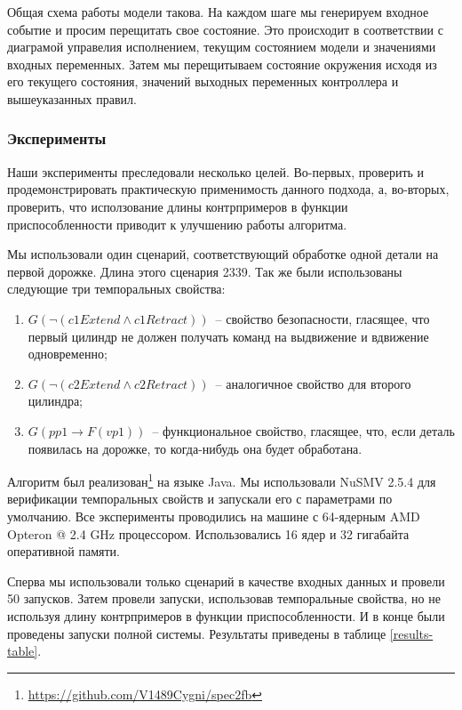 \documentclass[14pt]{extarticle}
\theoremstyle{plain}
\theoremstyle{definition}
\begin{document}
Общая схема работы модели такова. На каждом шаге мы генерируем входное событие
и просим перещитать свое состояние. Это происходит в соответствии с диаграмой
управелия исполнением, текущим состоянием модели и значениями входных
переменных. Затем мы перещитываем состояние окружения исходя из его текущего
состояния, значений выходных переменных контроллера и вышеуказанных правил.

\subsubsection{Эксперименты}

Наши эксперименты преследовали несколько целей. Во-первых, проверить и
продемонстрировать практическую применимость данного подхода, а, во-вторых,
проверить, что исползование длины контрпримеров в функции приспособленности
приводит к улучшению работы алгоритма.

Мы использовали один сценарий, соответствующий обработке одной детали на
первой дорожке. Длина этого сценария 2339. Так же были использованы
следующие три темпоральных свойства:
\begin{enumerate}
    \item $G(\lnot (c1Extend \wedge c1Retract))$~-- свойство безопасности, гласящее, что
первый цилиндр не должен получать команд на выдвижение и вдвижение одновременно;
    \item $G(\lnot (c2Extend \wedge c2Retract))$~-- аналогичное свойство для второго цилиндра;
    \item $G(pp1 \rightarrow F(vp1))$~-- функциональное свойство, гласящее, что, если деталь
появилась на дорожке, то когда-нибудь она будет обработана.
\end{enumerate}

Алгоритм был реализован\footnote{\url{https://github.com/V1489Cygni/spec2fb}} на языке Java.
Мы использовали NuSMV 2.5.4 для верификации
темпоральных свойств и запускали его с параметрами по умолчанию. Все эксперименты
проводились на машине с 64-ядерным AMD Opteron @ 2.4 GHz процессором.
Использовались 16 ядер и 32 гигабайта оперативной памяти.

Сперва мы использовали только сценарий в качестве входных данных и провели 50 запусков.
Затем провели запуски, использовав темпоральные свойства, но не используя длину
контрпримеров в функции приспособленности. И в конце были проведены запуски полной
системы. Результаты приведены в таблице \ref{results-table}.
\end{document}

